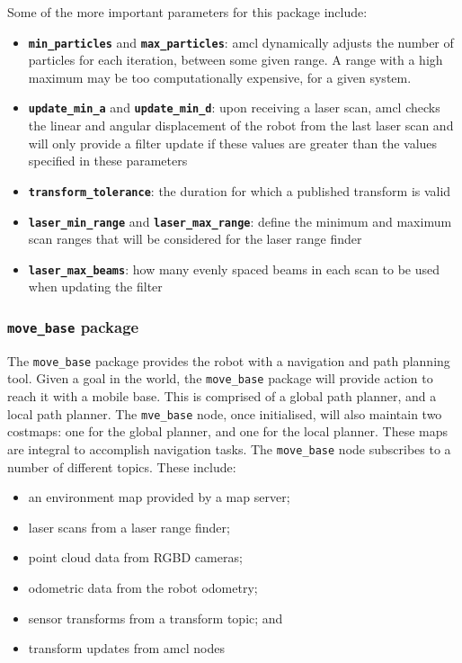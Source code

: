 \documentclass[a4paper]{article}
\begin{document}
Some of the more important parameters for this package include:
\begin{itemize}
\item \textbf{\texttt{min\_particles}} and \textbf{\texttt{max\_particles}}: amcl dynamically adjusts the number of particles for each iteration, between some given range. A range with a high maximum may be too computationally expensive, for a given system.
\item \textbf{\texttt{update\_min\_a}} and \textbf{\texttt{update\_min\_d}}: upon receiving a laser scan, amcl checks the linear and angular displacement of the robot from the last laser scan and will only provide a filter update if these values are greater than the values specified in these parameters 
\item \textbf{\texttt{transform\_tolerance}}: the duration for which a published transform is valid
\item \textbf{\texttt{laser\_min\_range}} and \textbf{\texttt{laser\_max\_range}}: define the minimum and maximum scan ranges that will be considered for the laser range finder 
\item \textbf{\texttt{laser\_max\_beams}}: how many evenly spaced beams in each scan to be used when updating the filter
\end{itemize}

\subsubsection{\texttt{move\_base} package}
The \texttt{move\_base} package provides the robot with a navigation and path planning tool. Given a goal in the world, the \texttt{move\_base} package will provide action to reach it with a mobile base. This is comprised of a global path planner, and a local path planner. The \texttt{mve\_base} node, once initialised, will also maintain two costmaps: one for the global planner, and one for the local planner. These maps are integral to accomplish navigation tasks. The \texttt{move\_base} node subscribes to a number of different topics. These include:
\begin{itemize}
\item an environment map provided by a map server;
\item laser scans from a laser range finder;
\item point cloud data from RGBD cameras;
\item odometric data from the robot odometry;
\item sensor transforms from a transform topic; and
\item transform updates from amcl nodes
\end{itemize}
\end{document}
